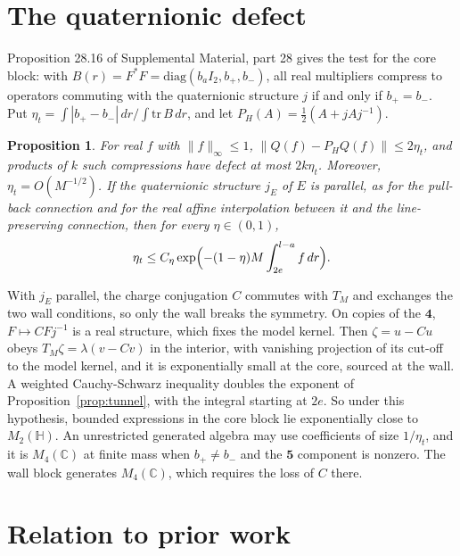 \documentclass[aps,prd,reprint,onecolumn,nofootinbib,amsmath,amssymb,floatfix]{revtex4-2}
\theoremstyle{plain}
\newtheorem{proposition}[theorem]{Proposition}
\newcommand{\C}{\mathbb C}
\renewcommand{\H}{\mathbb H}
\newcommand{\supp}[1]{Supplemental Material, part #1}
\begin{document}
\section{The quaternionic defect}

Proposition 28.16 of \supp{28} gives the test for the core block: with $B(r)=F^*F=\mathrm{diag}(b_aI_2,b_+,b_-)$, all real multipliers compress to operators commuting with the quaternionic structure $j$ if and only if $b_+=b_-$. Put $\eta_t=\int|b_+-b_-|\,dr/\int\mathrm{tr}\,B\,dr$, and let $P_H(A)=\frac12(A+jAj^{-1})$.

\begin{proposition}\label{prop:defect}
For real $f$ with $\|f\|_\infty\le1$, $\|Q(f)-P_HQ(f)\|\le2\eta_t$, and products of $k$ such compressions have defect at most $2k\eta_t$. Moreover, $\eta_t=O(M^{-1/2})$. If the quaternionic structure $j_E$ of $E$ is parallel, as for the pull-back connection and for the real affine interpolation between it and the line-preserving connection, then for every $\eta\in(0,1)$,
\begin{equation}
\eta_t\le C_\eta\exp\Bigl(-(1-\eta)M\int_{2e}^{l-a}f\,dr\Bigr).
\end{equation}
\end{proposition}

With $j_E$ parallel, the charge conjugation $C$ commutes with $T_M$ and exchanges the two wall conditions, so only the wall breaks the symmetry. On copies of the $\mathbf 4$, $F\mapsto CFj^{-1}$ is a real structure, which fixes the model kernel. Then $\zeta=u-Cu$ obeys $T_M\zeta=\lambda(v-Cv)$ in the interior, with vanishing projection of its cut-off to the model kernel, and it is exponentially small at the core, sourced at the wall. A weighted Cauchy-Schwarz inequality doubles the exponent of Proposition~\ref{prop:tunnel}, with the integral starting at $2e$. So under this hypothesis, bounded expressions in the core block lie exponentially close to $M_2(\H)$. An unrestricted generated algebra may use coefficients of size $1/\eta_t$, and it is $M_4(\C)$ at finite mass when $b_+\ne b_-$ and the $\mathbf 5$ component is nonzero. The wall block generates $M_4(\C)$, which requires the loss of $C$ there.

\section{Relation to prior work}
\end{document}
